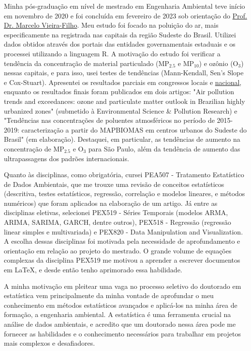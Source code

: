 \documentclass[12pt,a4paper]{article}
\begin{document}
	Minha pós-graduação em nível de mestrado em Engenharia Ambiental teve início em novembro de 2020 e foi concluída em fevereiro de 2023 sob orientação do \href{http://lattes.cnpq.br/5059318976988668}{Prof. Dr. Marcelo Vieira-Filho}. Meu estudo foi focado na poluição do ar, mais especificamente na registrada nas capitais da região Sudeste do Brasil. Utilizei dados obtidos através dos portais das entidades governamentais estaduais e os processei utilizando a linguagem R. A motivação do estudo foi verificar a tendência da concentração de material particulado (MP$_{2.5}$ e MP$_{10}$) e ozônio (O$_3$) nessas capitais, e para isso, usei testes de tendências (Mann-Kendall, Sen's Slope e Cox-Stuart). Apresentei os resultados parciais em congressos locais e \href{http://www.meioambientepocos.com.br/ANAIS2022/76%20-%20244016_crescimento-da-concentrao-de-materiais-particulados-e-oznio-em-capitais-brasileiras.pdf}{nacional}, enquanto os resultados finais foram publicados em dois artigos: "Air pollution trends and exceedances: ozone and particulate matter outlook in Brazilian highly urbanized zones" (submetido à Environmental Science \& Pollution Research) e "Tendências nas concentrações de poluentes atmosféricos no período de 2015-2019: caracterização a partir do MAPBIOMAS em centros urbanos do Sudeste do Brasil" (em elaboração). Destaquei, em particular, as tendências de aumento na concentração de MP$_{2.5}$ e O$_3$ para São Paulo, além da tendência de aumento das ultrapassagens dos padrões internacionais.
	
	Quanto às disciplinas, como obrigatória, cursei PEA507 - Tratamento Estatístico de Dados Ambientais, que me trouxe uma revisão de conceitos estatísticos (descritiva, testes estatísticos, regressão, correlação e modelos lineares, e métodos numéricos) que foram aplicados na elaboração de um artigo. Já entre as disciplinas eletivas, selecionei PEX519 - Séries Temporais (modelos ARMA, ARIMA, SARIMA, GARCH, dentre outros), PEX518 - Regressão (regressão linear simples e multivariada) e PEX820 - Data Manipulation and Visualization. A escolha dessas disciplinas foi motivada pela necessidade de aprofundamento e orientação em relação ao projeto do mestrado. O grande volume de equações complexas da disciplina PEX519 me motivou a aprender a escrever documentos em \LaTeX, e desde então tenho aprimorado essa habilidade.

	
	A minha motivação em pleitear uma vaga no processo seletivo do doutorado em estatística vem principalmente da minha vontade de aprofundar o meu conhecimento em métodos estatísticos avançados e aplicá-los na minha área de formação, a engenharia ambiental. A estatística é uma ferramenta crucial na análise de dados ambientais, e acredito que um doutorado nessa área pode me fornecer as habilidades e o conhecimento necessários para trabalhar em projetos mais complexos e desafiadores.
	
\end{document}
